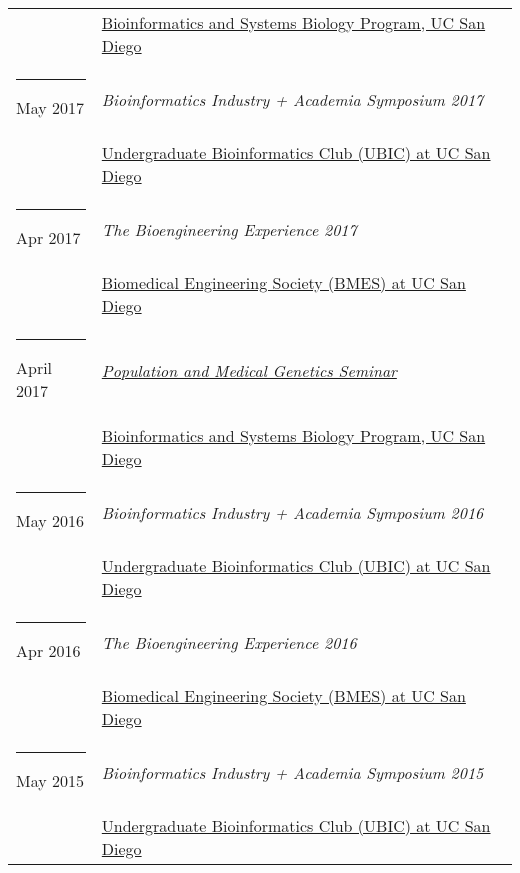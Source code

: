 \documentclass[margin,line]{res}
\begin{document}
\begin{resume}
\begin{longtable}{@{}p{0.7in}p{4in}}
\hspace*{-4mm} & \hspace{4mm} \href{http://bioinformatics.ucsd.edu/}{Bioinformatics and Systems Biology Program, UC San Diego}\\
\hspace*{-4mm} \rule{-1mm}{5mm} May 2017 & \textit{Bioinformatics Industry + Academia Symposium 2017}\\*
\hspace*{-4mm} & \hspace{4mm} \href{http://ubicucsd.github.io/}{Undergraduate Bioinformatics Club (UBIC) at UC San Diego}\\
\hspace*{-4mm} \rule{-1mm}{5mm} Apr 2017 & \textit{The Bioengineering Experience 2017}\\*
\hspace*{-4mm} & \hspace{4mm} \href{http://bmes.ucsd.edu/}{Biomedical Engineering Society (BMES) at UC San Diego}\\
\hspace*{-4mm} \rule{-1mm}{5mm} April 2017 & \href{https://gymreklab.github.io/teaching/medpopgen_seminar.html}{\textit{Population and Medical Genetics Seminar}}\\*
\hspace*{-4mm} & \hspace{4mm} \href{http://ubicucsd.github.io/}{Bioinformatics and Systems Biology Program, UC San Diego}\\
\hspace*{-4mm} \rule{-1mm}{5mm} May 2016 & \textit{Bioinformatics Industry + Academia Symposium 2016}\\*
\hspace*{-4mm} & \hspace{4mm} \href{http://ubicucsd.github.io/}{Undergraduate Bioinformatics Club (UBIC) at UC San Diego}\\
\hspace*{-4mm} \rule{-1mm}{5mm} Apr 2016 & \textit{The Bioengineering Experience 2016}\\*
\hspace*{-4mm} & \hspace{4mm} \href{http://bmes.ucsd.edu/}{Biomedical Engineering Society (BMES) at UC San Diego}\\
\hspace*{-4mm} \rule{-1mm}{5mm} May 2015 & \textit{Bioinformatics Industry + Academia Symposium 2015}\\*
\hspace*{-4mm} & \hspace{4mm} \href{http://ubicucsd.github.io/}{Undergraduate Bioinformatics Club (UBIC) at UC San Diego}\\
\end{longtable}


\end{resume}
\end{document}

